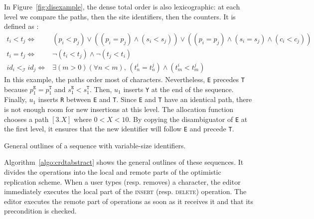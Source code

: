 In Figure~\ref{fig:disexample}, the dense total order is also lexicographic: at
each level we compare the paths, then the site identifiers, then the
counters. It is defined as :
\begin{align*}
  t_i < t_j \iff & (p_i < p_j) \vee  %
                  ((p_i = p_j) \wedge (s_i<s_j)) \vee %
                  ((p_i = p_j) \wedge (s_i = s_j) \wedge (c_i < c_j)) \\
  t_i = t_j \iff & \neg (t_i < t_j) \wedge \neg (t_j < t_i) \\
  id_i <_\mathcal{I} id_j \iff & \exists (m > 0)(\forall n < m),\, (t^i_n = t^j_n) \wedge                             (t^i_m < t^j_m) %
\end{align*}
In this example, the paths order most of characters. Nevertheless, \texttt{E}
precedes \texttt{T} because $p^\texttt{E}_1=p^\texttt{T}_1$ and
$s^\texttt{E}_1 < s^\texttt{T}_1$. Then, $u_1$ inserts \texttt{Y} at the end of
the sequence. Finally, $u_1$ inserts \texttt{R} between \texttt{E} and
\texttt{T}. Since \texttt{E} and \texttt{T} have an identical path, there is not
enough room for new insertions at this level. The allocation function chooses a
path $[3.X]$ where $0<X<10$. By copying the disambiguator of \texttt{E} at the
first level, it ensures that the new identifier will follow \texttt{E} and
precede \texttt{T}.


\begin{algorithm}[h]
  
  \caption{\label{algo:crdtabstract}General outlines of a sequence with
    variable-size identifiers.}
\end{algorithm}


Algorithm~\ref{algo:crdtabstract} shows the general outlines of these
sequences. It divides the operations into the local and remote parts of the
optimistic replication scheme. When a user types (resp. removes) a character,
the editor immediately executes the local part of the \textsc{insert}
(resp. \textsc{delete}) operation. The editor executes the remote part of
operations as soon as it receives it and that its precondition is checked.

